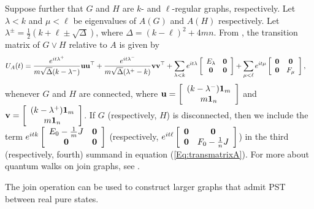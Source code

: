 \documentclass[11pt]{article}
\newcommand{\zero}{{\bf{0}}}
\newcommand{\ones}{{\bf{1}}}
\newcommand{\bv}{\mathbf v}
\newcommand{\bu}{\mathbf u}
\begin{document}
Suppose further that $G$ and $H$ are $k$- and $\ell$-regular graphs, respectively. Let $\lambda<k$ and $\mu<\ell$ be eigenvalues of $A(G)$ and $A(H)$ respectively. Let $\lambda^{\pm }=\frac{1}{2}(k+\ell\pm \sqrt{\Delta})$, where $\Delta=(k-\ell)^2+4mn$. From \cite[Equation 12.2.1]{Coutinho2021}, the transition matrix of $G\vee H$ relative to $A$ is given by 
\begin{equation}
\label{Eq:transmatrixA}
\begin{split}
U_{A}(t)&=\frac{e^{it\lambda^+}}{m\sqrt{\Delta}(k-\lambda^-)}\bu\bu^\top+\frac{e^{it\lambda^-}}{m\sqrt{\Delta}(\lambda^+-k)}\bv\bv^\top+\sum_{\lambda<k}e^{it\lambda}\left[\begin{array}{cc} E_{\lambda}&\zero \\ \zero&\zero\end{array} \right]+\sum_{\mu<\ell}e^{it\mu}\left[\begin{array}{cc} \zero&\zero \\ \zero&F_{\mu}\end{array} \right],      
\end{split}
\end{equation}
whenever $G$ and $H$ are connected, where $\bu=\left[ \begin{array}{ccccc} (k-\lambda^{-})\ones_{m} \\ m\ones_{n}\end{array} \right]$ and $\bv=\left[ \begin{array}{ccccc} (k-\lambda^{+})\ones_{m} \\ m\ones_{n}\end{array} \right]$. If $G$ (respectively, $H$) is disconnected, then we include the term $e^{itk}\left[\begin{array}{cc} E_{0}-\frac{1}{m}J&\zero \\ \zero&\zero\end{array} \right]$ (respectively, $e^{it\ell}\left[\begin{array}{cc} \zero&\zero \\ \zero&F_{0}-\frac{1}{n}J\end{array} \right]$) in the third (respectively, fourth) summand in equation (\ref{Eq:transmatrixA}). For more about quantum walks on join graphs, see \cite{kirkland2023quantum}.

The join operation can be used to construct larger graphs that admit PST between real pure states.
\end{document}
